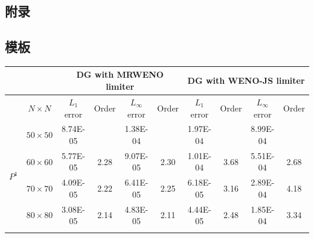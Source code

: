 \documentclass{book}
\begin{document}
\begin{example}
\begin{example}{}{}
\begin{example}
\begin{example}
\begin{example}
\chapter{附录}
\section{模板}
\begin{table}[ht]
    \small
    \centering
    \begin{tabular}{|c|c|cccc|cccc|}
        \hline
                               &                 & \multicolumn{4}{c|}{DG   with MRWENO limiter} & \multicolumn{4}{c|}{DG   with WENO-JS limiter}                                                                                                                                                                 \\ \hline
                               & $N\times N$     & \multicolumn{1}{c|}{$L_1$ error}              & \multicolumn{1}{c|}{Order}                     & \multicolumn{1}{c|}{$L_\infty$ error} & Order & \multicolumn{1}{c|}{$L_1$ error} & \multicolumn{1}{c|}{Order} & \multicolumn{1}{c|}{$L_\infty$ error} & Order \\ \hline
        \multirow{6}{*}{$P^1$} & $50\times 50$   & \multicolumn{1}{c|}{8.74E-05}                 & \multicolumn{1}{c|}{}                          & \multicolumn{1}{c|}{1.38E-04}         &       & \multicolumn{1}{c|}{1.97E-04}    & \multicolumn{1}{c|}{}      & \multicolumn{1}{c|}{8.99E-04}         &       \\ \cline{2-10}
                               & $60\times 60$   & \multicolumn{1}{c|}{5.77E-05}                 & \multicolumn{1}{c|}{2.28}                      & \multicolumn{1}{c|}{9.07E-05}         & 2.30  & \multicolumn{1}{c|}{1.01E-04}    & \multicolumn{1}{c|}{3.68}  & \multicolumn{1}{c|}{5.51E-04}         & 2.68  \\ \cline{2-10}
                               & $70\times 70$   & \multicolumn{1}{c|}{4.09E-05}                 & \multicolumn{1}{c|}{2.22}                      & \multicolumn{1}{c|}{6.41E-05}         & 2.25  & \multicolumn{1}{c|}{6.18E-05}    & \multicolumn{1}{c|}{3.16}  & \multicolumn{1}{c|}{2.89E-04}         & 4.18  \\ \cline{2-10}
                               & $80\times 80$   & \multicolumn{1}{c|}{3.08E-05}                 & \multicolumn{1}{c|}{2.14}                      & \multicolumn{1}{c|}{4.83E-05}         & 2.11  & \multicolumn{1}{c|}{4.44E-05}    & \multicolumn{1}{c|}{2.48}  & \multicolumn{1}{c|}{1.85E-04}         & 3.34  \\ \cline{2-10}

\end{tabular}
\end{table}
\end{example}
\end{example}
\end{example}
\end{example}
\end{example}
\end{document}
